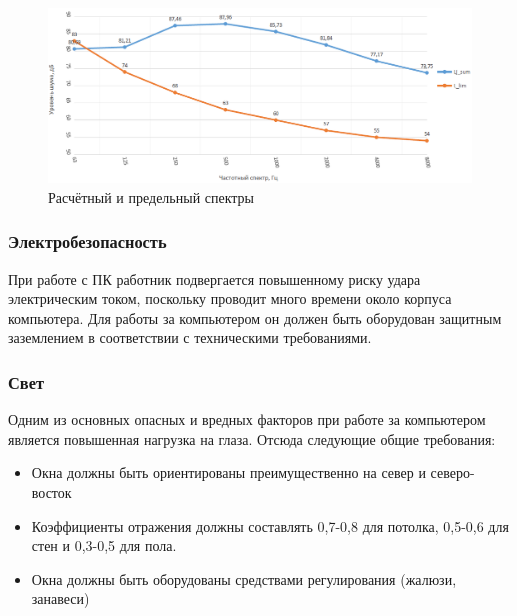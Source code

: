 \begin{figure}[h]
  \includegraphics[width=\textwidth]{img/spectrum.png}
  \caption{Расчётный и предельный спектры}
  \label{fig:srvspectrum}
\end{figure}

\subsubsection{Электробезопасность}

При работе с ПК работник подвергается повышенному риску удара электрическим током, поскольку проводит много времени около корпуса компьютера. Для работы за компьютером он должен быть оборудован защитным заземлением в соответствии с техническими требованиями.

\subsubsection{Свет}

Одним из основных опасных и вредных факторов при работе за компьютером является повышенная нагрузка на глаза. Отсюда следующие общие требования:
\begin{itemize}
	\item Окна должны быть ориентированы преимущественно на север и северо-восток
	\item Коэффициенты отражения должны составлять 0,7-0,8 для потолка, 0,5-0,6 для стен и 0,3-0,5 для пола.
	\item Окна должны быть оборудованы средствами регулирования (жалюзи, занавеси)
\end{itemize}

